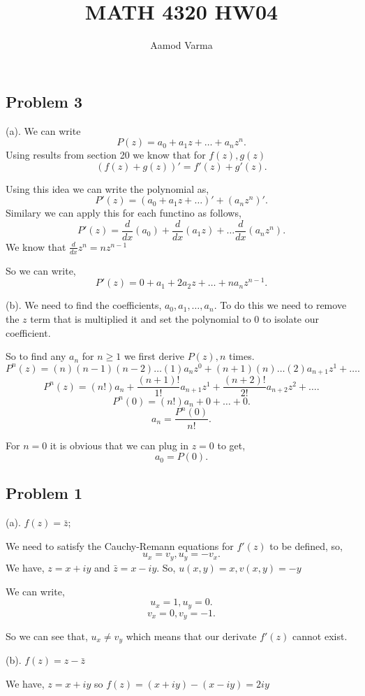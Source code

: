 \documentclass[a4paper]{report}
\title{MATH 4320 HW04}
\author{Aamod Varma}
\begin{document}
\maketitle

\subsection*{Problem 3}
(a).  We can write \[
P(z) = a_0 + a_1z + \dots + a_nz^n 
.\]
Using results from section 20 we know that for $f(z),g(z)$\[
    (f(z) + g(z))' = f'(z) + g'(z)
.\] 

Using this idea we can write the polynomial as, \[
    P'(z) = (a_0+ a_1z + \dots)' + (a_nz^n)'
.\] 
Similary we can apply this for each functino as follows,\[
    P'(z) = \frac{d}{dx}(a_0) + \frac{d}{dx}(a_1z) + \dots \frac{d}{dx}(a_nz^n)
.\] 
We know that $\frac{d}{dx}z^n = nz^{n - 1}$ 

So we can write, \[
    P'(z) = 0 + a_1 + 2a_2z + \dots + na_nz^{n-1}
.\] 

(b). We need to find the coefficients, $a_0,a_1,\dots,a_n$. To do this we need to remove the $z$ term that is multiplied it and set the polynomial to  $0$ to isolate our coefficient.

So to find any $a_n$  for $n \ge 1$ we first derive $P(z), n$  times.
\[
    P^{n}(z) = (n)(n-1)(n-2)\dots(1)a_nz^0 + (n+1)(n)\dots(2)a_{n+1}z^1 + \dots
.\] \[
P^{n} (z) = (n!)a_n + \frac{(n+1)!}{1!}a_{n+1}z^1 + \frac{(n+2)!}{2!}a_{n + 2}z^2 + \dots
.\] 
\[
P^n (0) = (n!)a_n + 0 + \dots + 0
.\] 
\[
a_n = \frac{P^n(0)}{n!}
.\] 

For $n = 0$ it is obvious that we can plug in  $z = 0$ to get,  \[
a_0 = P(0)
.\] 


\subsection*{Problem 1}
(a). $f(z) = \bar z$;

We need to satisfy the Cauchy-Remann equations for $f'(z)$ to be defined, so, \[
    u_x = v_y, u_y = -v_x
.\] 
We have, $z = x + iy$ and $\bar z = x - iy$. So, $u(x,y) = x, v(x,y) = -y$

We can write,  \[
    u_x = 1, u_y = 0
.\]
\[
    v_x = 0, v_y = -1
.\] 

So we can see that, $u_x \neq v_y$ which means that our derivate $f'(z)$ cannot exist.

(b). $f(z) = z - \bar z$

We have, $z = x + iy$ so  $f(z) = (x + iy) - (x - iy) = 2iy$
\end{document}
